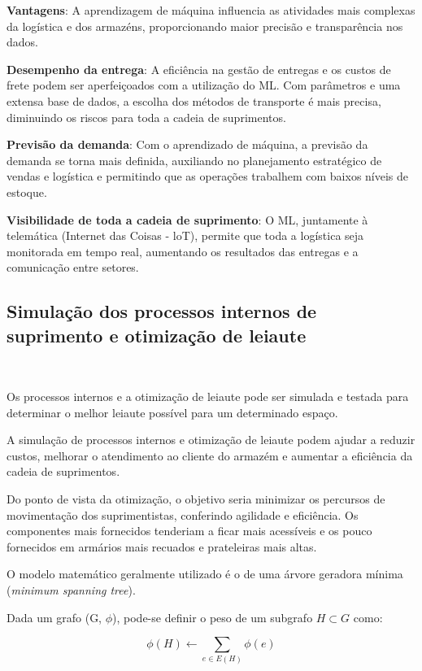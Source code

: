\documentclass{abntex2}
\begin{document}
\begin{sloppypar}
\textbf{Vantagens}: A aprendizagem de máquina influencia as atividades mais complexas da logística e dos armazéns, proporcionando maior precisão e transparência nos dados.

\textbf{Desempenho da entrega}: A eficiência na gestão de entregas e os custos de frete podem ser aperfeiçoados com a utilização do ML. Com parâmetros e uma extensa base de dados, a escolha dos métodos de transporte é mais precisa, diminuindo os riscos para toda a cadeia de suprimentos.

\textbf{Previsão da demanda}: Com o aprendizado de máquina, a previsão da demanda se torna mais definida, auxiliando no planejamento estratégico de vendas e logística e permitindo que as operações trabalhem com baixos níveis de estoque.

\textbf{Visibilidade de toda a cadeia de suprimento}: O ML, juntamente à telemática (Internet das Coisas - loT), permite que toda a logística seja monitorada em tempo real, aumentando os resultados das entregas e a comunicação entre setores.

\subsection{Simulação dos processos internos de suprimento e otimização de leiaute}\

Os processos internos e a otimização de leiaute pode ser simulada e testada para determinar o melhor leiaute possível para um determinado espaço.

A simulação de processos internos e otimização de leiaute podem ajudar a reduzir custos, melhorar o atendimento ao cliente do armazém e aumentar a eficiência da cadeia de suprimentos.

Do ponto de vista da otimização, o objetivo seria minimizar os percursos de movimentação dos suprimentistas, conferindo agilidade e eficiência. Os componentes mais fornecidos tenderiam a ficar mais acessíveis e os pouco fornecidos em armários mais recuados e prateleiras mais altas.

O modelo matemático geralmente utilizado é o de uma árvore geradora mínima (\textit{minimum spanning tree}).

Dada um grafo (G, $\phi$), pode-se definir o peso de um subgrafo $H \subset G$ como:

\begin{equation} \label{eq:fo4}
	\phi(H) \gets \sum_{e \in E(H)} \phi (e)
\end{equation}


\end{sloppypar}
\end{document}
